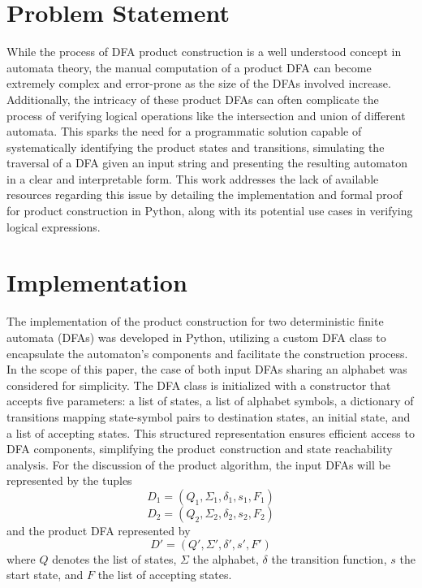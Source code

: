 \documentclass[conference]{IEEEtran}
\begin{document}
\section{Problem Statement}
While the process of DFA product construction is a well understood concept in automata theory, the manual computation of a product DFA can become extremely complex and error-prone as the size of the DFAs involved increase. Additionally, the intricacy of these product DFAs can often complicate the process of verifying logical operations like the intersection and union of different automata. This sparks the need for a programmatic solution capable of systematically identifying the product states and transitions, simulating the traversal of a DFA given an input string and presenting the resulting automaton in a clear and interpretable form. This work addresses the lack of available resources regarding this issue by detailing the implementation and formal proof for product construction in Python, along with its potential use cases in verifying logical expressions.

\section{Implementation}
The implementation of the product construction for two deterministic finite automata (DFAs) was developed in Python, utilizing a custom DFA class to encapsulate the automaton's components and facilitate the construction process. In the scope of this paper, the case of both input DFAs sharing an alphabet was considered for simplicity. The DFA class is initialized with a constructor that accepts five parameters: a list of states, a list of alphabet symbols, a dictionary of transitions mapping state-symbol pairs to destination states, an initial state, and a list of accepting states. This structured representation ensures efficient access to DFA components, simplifying the product construction and state reachability analysis. For the discussion of the product algorithm, the input DFAs will be represented by the tuples
\[ D_1 = (Q_1, \Sigma_1, \delta_1, s_1, F_1) \]
\[ D_2 = (Q_2, \Sigma_2, \delta_2, s_2, F_2) \]
and the product DFA represented by
\[ D' = (Q', \Sigma', \delta', s', F') \]
where $Q$ denotes the list of states, $\Sigma$ the alphabet, $\delta$ the transition function, $s$ the start state, and $F$ the list of accepting states. 
\end{document}
